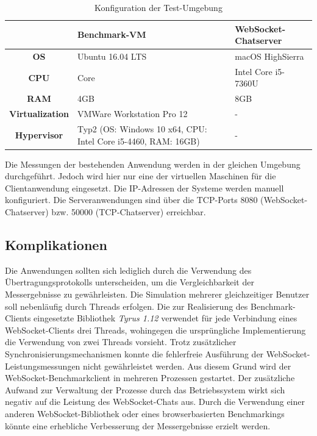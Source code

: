 \documentclass[11pt,a4paper,titlepage]{scrartcl}
\numberwithin{equation}{section}
\begin{document}
\renewcommand{\arraystretch}{1.5}
\begin{table}[ht]
	\begin{center}
		\begin{tabular}{|c|>{\centering\arraybackslash}m{7cm}|>{\centering\arraybackslash}m{5cm}|}
			\hline
			 &  \textbf{Benchmark-VM} &  \textbf{WebSocket-Chatserver}  \\ \hline
			\textbf{OS} &  Ubuntu 16.04 LTS &  macOS HighSierra \\ \hline
			\textbf{CPU} &  1 Core &  Intel Core i5-7360U  \\ \hline
			\textbf{RAM} &  4GB &  8GB  \\ \hline
			\textbf{Virtualization} &  VMWare Workstation Pro 12 &  -  \\ \hline
			\textbf{Hypervisor} &  Typ2 (OS: Windows 10 x64, CPU: Intel Core i5-4460, RAM: 16GB) &  -  \\ \hline
		\end{tabular}
		\caption{Konfiguration der Test-Umgebung}\label{tbl:evalEnv}
	\end{center}
\end{table}
\renewcommand{\arraystretch}{1}
\noindent Die Messungen der bestehenden Anwendung werden in der gleichen Umgebung durchgeführt. Jedoch wird hier nur eine der virtuellen Maschinen für die Clientanwendung eingesetzt. Die IP-Adressen der Systeme werden manuell konfiguriert. Die Serveranwendungen sind über die TCP-Ports 8080 (WebSocket-Chatserver) bzw. 50000 (TCP-Chatserver) erreichbar. 
\subsection{Komplikationen} \label{subsec:EvalKompl}
Die Anwendungen sollten sich lediglich durch die Verwendung des Übertragungsprotokolls unterscheiden, um die Vergleichbarkeit der Messergebnisse zu gewährleisten. Die Simulation mehrerer gleichzeitiger Benutzer soll nebenläufig durch Threads erfolgen. Die zur Realisierung des Benchmark-Clients eingesetzte Bibliothek \textit{Tyrus 1.12} verwendet für jede Verbindung eines WebSocket-Clients drei Threads, wohingegen die ursprüngliche Implementierung die Verwendung von zwei Threads vorsieht. Trotz zusätzlicher Synchronisierungsmechanismen konnte die fehlerfreie Ausführung der WebSocket-Leistungsmessungen nicht gewährleistet werden. Aus diesem Grund wird der WebSocket-Benchmarkclient in mehreren Prozessen gestartet. Der zusätzliche Aufwand zur Verwaltung der Prozesse durch das Betriebssystem wirkt sich negativ auf die Leistung des WebSocket-Chats aus. Durch die Verwendung einer anderen WebSocket-Bibliothek oder eines browserbasierten Benchmarkings könnte eine erhebliche Verbesserung der Messergebnisse erzielt werden. \\
\end{document}
